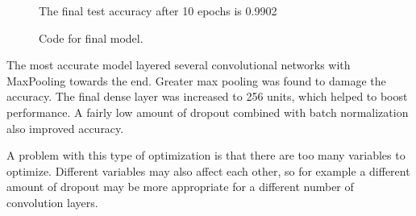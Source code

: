 \documentclass[12pt]{article} %
\begin{document}
\begin{figure}[H]
	\vspace{-10mm}
	\caption{The final test accuracy after 10 epochs is 0.9902}
\end{figure}

\begin{figure}[H]
	\vspace{-10mm}
	\caption{Code for final model.}
\end{figure}

The most accurate model layered several convolutional networks with MaxPooling towards the end. Greater max pooling was found to damage the accuracy. The final dense layer was increased to 256 units, which helped to boost performance. A fairly low amount of dropout combined with batch normalization also improved accuracy.

A problem with this type of optimization is that there are too many variables to optimize. Different variables may also affect each other, so for example a different amount of dropout may be more appropriate for a different number of convolution layers.
\end{document}

